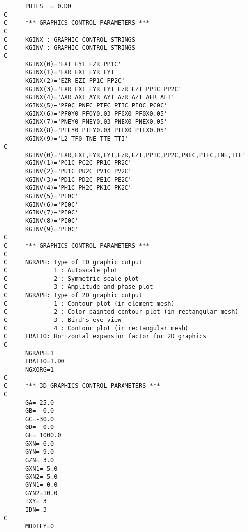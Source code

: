 {\begin{verbatim}
      PHIES  = 0.D0
C
C     *** GRAPHICS CONTROL PARAMETERS ***
C
C     KGINX : GRAPHIC CONTROL STRINGS
C     KGINV : GRAPHIC CONTROL STRINGS
C
      KGINX(0)='EXI EYI EZR PP1C'
      KGINX(1)='EXR EXI EYR EYI'
      KGINX(2)='EZR EZI PP1C PP2C'
      KGINX(3)='EXR EXI EYR EYI EZR EZI PP1C PP2C'
      KGINX(4)='AXR AXI AYR AYI AZR AZI AFR AFI'
      KGINX(5)='PF0C PNEC PTEC PTIC PIOC PC0C'
      KGINX(6)='PF0Y0 PFOY0.03 PF0X0 PF0X0.05'
      KGINX(7)='PNEY0 PNEY0.03 PNEX0 PNEX0.05'
      KGINX(8)='PTEY0 PTEY0.03 PTEX0 PTEX0.05'
      KGINX(9)='L2 TF0 TNE TTE TTI'
C
      KGINV(0)='EXR,EXI,EYR,EYI,EZR,EZI,PP1C,PP2C,PNEC,PTEC,TNE,TTE'
      KGINV(1)='PC1C PC2C PR1C PR2C'
      KGINV(2)='PU1C PU2C PV1C PV2C'
      KGINV(3)='PD1C PD2C PE1C PE2C'
      KGINV(4)='PH1C PH2C PK1C PK2C'
      KGINV(5)='PI0C'
      KGINV(6)='PI0C'
      KGINV(7)='PI0C'
      KGINV(8)='PI0C'
      KGINV(9)='PI0C'
C
C     *** GRAPHICS CONTROL PARAMETERS ***
C
C     NGRAPH: Type of 1D graphic output
C             1 : Autoscale plot
C             2 : Symmetric scale plot
C             3 : Amplitude and phase plot
C     NGRAPH: Type of 2D graphic output
C             1 : Contour plot (in element mesh)      
C             2 : Color-painted contour plot (in rectangular mesh)
C             3 : Bird's eye view
C             4 : Contour plot (in rectangular mesh)
C     FRATIO: Horizontal expansion factor for 2D graphics
C
      NGRAPH=1
      FRATIO=1.D0
      NGXORG=1
C
C     *** 3D GRAPHICS CONTROL PARAMETERS ***
C
      GA=-25.0
      GB=  0.0
      GC=-30.0
      GD=  0.0
      GE= 1000.0
      GXN= 6.0
      GYN= 9.0
      GZN= 3.0
      GXN1=-5.0
      GXN2= 5.0
      GYN1= 0.0
      GYN2=10.0
      IXY= 3
      IDN=-3
C
      MODIFY=0
\end{verbatim}
}
